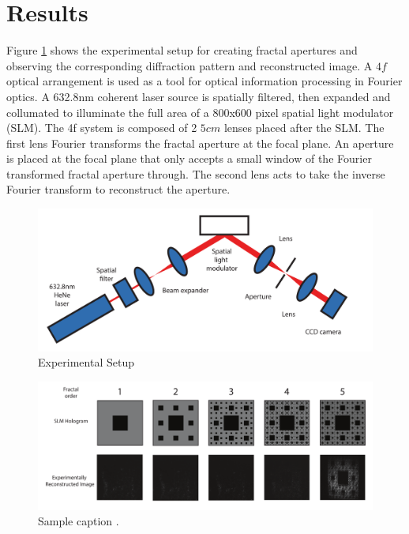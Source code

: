 %
%

\section{Results}
Figure \ref{ExpSetup} shows the experimental setup for creating fractal apertures and observing the corresponding diffraction pattern and reconstructed image. A $4f$ optical arrangement is used as a tool for optical information processing in Fourier optics. A 632.8nm coherent laser source is spatially filtered, then expanded and collumated to illuminate the full area of a 800x600 pixel spatial light modulator (SLM). The 4f system is composed of 2 $5cm$ lenses placed after the SLM. The first lens Fourier transforms the fractal aperture at the focal plane. An aperture is placed at the focal plane that only accepts a small window of the Fourier transformed fractal aperture through. The second lens acts to take the inverse Fourier transform to reconstruct the aperture.
\begin{figure}[!ht]
\includegraphics[width=\textwidth]{ExpSetup2.pdf}
\caption{Experimental Setup}
\label{ExpSetup}
\end{figure}

\begin{figure}[h!t]
\includegraphics[width=\textwidth]{ExperimentallHolgramReconstruction.pdf}
\caption{Sample caption .}
\label{Recon}
\end{figure}

